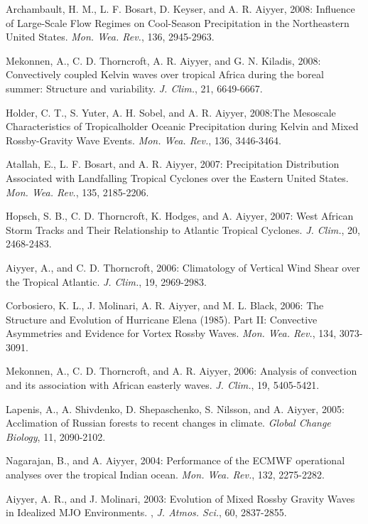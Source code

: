 \begin{ilist}
\item Archambault, H. M., L. F. Bosart, D. Keyser, and A. R. Aiyyer, 2008: Influence of Large-Scale Flow Regimes on Cool-Season Precipitation in the Northeastern United States. \emph{Mon. Wea. Rev.}, 136, 2945-2963. 

\item Mekonnen, A., C. D. Thorncroft, A. R. Aiyyer, and G. N. Kiladis, 2008: Convectively coupled Kelvin waves over tropical Africa during the boreal summer: Structure and variability. \emph{J. Clim.}, 21, 6649-6667.

\item Holder, C. T., S. Yuter, A. H. Sobel, and A. R. Aiyyer, 2008:The Mesoscale Characteristics of Tropicalholder Oceanic Precipitation during Kelvin and Mixed Rossby-Gravity Wave Events. \emph{Mon. Wea. Rev.}, 136, 3446-3464. 

\item Atallah, E., L. F. Bosart, and A. R. Aiyyer, 2007: Precipitation Distribution Associated with Landfalling Tropical Cyclones over the Eastern United States. \emph{Mon. Wea. Rev.}, 135, 2185-2206.

\item Hopsch, S. B., C. D. Thorncroft, K. Hodges, and A. Aiyyer, 2007: West African Storm Tracks and Their Relationship to Atlantic Tropical Cyclones. \emph{J. Clim.}, 20, 2468-2483.

\item Aiyyer, A., and C. D. Thorncroft, 2006: Climatology of Vertical Wind Shear over the Tropical Atlantic. \emph{J. Clim.}, 19, 2969-2983.

\item Corbosiero, K. L., J. Molinari, A. R. Aiyyer, and M. L. Black, 2006: The Structure and Evolution of Hurricane Elena (1985). Part II: Convective Asymmetries and Evidence for Vortex Rossby Waves. \emph{Mon. Wea. Rev.}, 134, 3073-3091. 

\item Mekonnen, A., C. D. Thorncroft, and A. R. Aiyyer, 2006: Analysis of convection and its association with African easterly waves. \emph{J. Clim.}, 19, 5405-5421.

\item Lapenis, A., A. Shivdenko, D. Shepaschenko, S. Nilsson, and A. Aiyyer, 2005: Acclimation of Russian forests to recent changes in climate. \emph{ Global Change Biology}, 11, 2090-2102.

\item Nagarajan, B., and A. Aiyyer, 2004: Performance of the ECMWF operational analyses over the tropical Indian ocean. \emph{Mon. Wea. Rev.}, 132, 2275-2282. 

\item Aiyyer, A. R., and J. Molinari, 2003: Evolution of Mixed Rossby Gravity Waves in Idealized MJO Environments. , \emph{J. Atmos. Sci.}, 60, 2837-2855.

\end{ilist}
